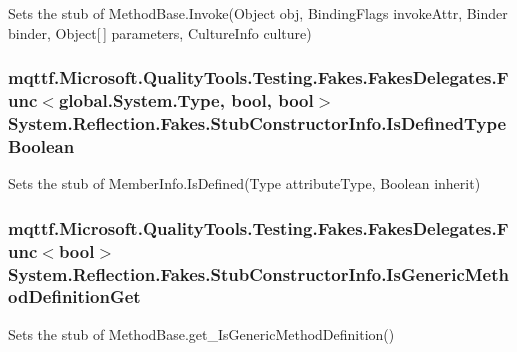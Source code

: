 Sets the stub of Method\-Base.\-Invoke(\-Object obj, Binding\-Flags invoke\-Attr, Binder binder, Object\mbox{[}$\,$\mbox{]} parameters, Culture\-Info culture)

\hypertarget{class_system_1_1_reflection_1_1_fakes_1_1_stub_constructor_info_a6ff3bd26fa11a41a1e3eaa92ff5d7f0c}{
\subsubsection[{Is\-Defined\-Type\-Boolean}]{\setlength{\rightskip}{0pt plus 5cm}mqttf.\-Microsoft.\-Quality\-Tools.\-Testing.\-Fakes.\-Fakes\-Delegates.\-Func$<$global.\-System.\-Type, bool, bool$>$ System.\-Reflection.\-Fakes.\-Stub\-Constructor\-Info.\-Is\-Defined\-Type\-Boolean}}\label{class_system_1_1_reflection_1_1_fakes_1_1_stub_constructor_info_a6ff3bd26fa11a41a1e3eaa92ff5d7f0c}


Sets the stub of Member\-Info.\-Is\-Defined(\-Type attribute\-Type, Boolean inherit)

\hypertarget{class_system_1_1_reflection_1_1_fakes_1_1_stub_constructor_info_a58c3c26e405dcdbdcdb4cb307e8255db}{
\subsubsection[{Is\-Generic\-Method\-Definition\-Get}]{\setlength{\rightskip}{0pt plus 5cm}mqttf.\-Microsoft.\-Quality\-Tools.\-Testing.\-Fakes.\-Fakes\-Delegates.\-Func$<$bool$>$ System.\-Reflection.\-Fakes.\-Stub\-Constructor\-Info.\-Is\-Generic\-Method\-Definition\-Get}}\label{class_system_1_1_reflection_1_1_fakes_1_1_stub_constructor_info_a58c3c26e405dcdbdcdb4cb307e8255db}


Sets the stub of Method\-Base.\-get\-\_\-\-Is\-Generic\-Method\-Definition()

